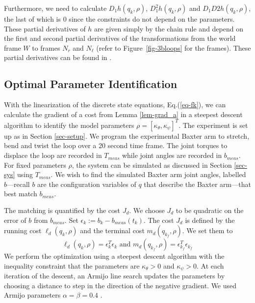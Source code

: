 \documentclass[letterpaper, 10pt, conference]{ieeeconf}
\begin{document}
Furthermore, we need to calculate $D_1h(q_k,\rho)$, $D_1^2h(q_k,\rho)$ and $D_1D2h(q_k,\rho)$, the last of which is $0$ since the constraints do not depend on the parameters.  These partial derivatives of $h$ are given simply by the chain rule and depend on the first and second partial derivatives of the transformations from the world frame $W$ to frames $N_r$ and $N_\ell$ (refer to Figure~\ref{fig-3bloops} for the frames).  These partial derivatives can be found in \cite{johnson_murphey_linearization}.  

\subsection{Optimal Parameter Identification}

With the linearization of the discrete state equations, Eq.(\ref{eq-fk}), we can calculate the gradient of a cost from Lemma \ref{lem-grad_a} in a steepest descent algorithm to identify the model parameters $\rho = [\kappa_\theta,\kappa_\psi]^T$.  The experiment is set up as in Section \ref{sec-setup}.  We program the experimental Baxter arm to stretch, bend and twist the loop over a 20 second time frame. The joint torques to displace the loop are recorded in $T_{meas}$ while joint angles are recorded in $b_{meas}$.    For fixed parameters $\rho$, the system can be simulated as discussed in Section \ref{sec-sys} using $T_{meas}$.  We wish to find the simulated Baxter arm joint angles, labelled $b$---recall $b$ are the configuration variables of $q$ that describe the Baxter arm---that best match $b_{meas}$.

The matching is quantified by the cost $J_d$.  We choose $J_d$ to be quadratic on the error of $b$ from $b_{meas}$.   Set $\epsilon_k := b_k-b_{meas}(t_k)$.  The cost $J_d$ is defined by the running cost $\ell_d(q_k,\rho)$ and the terminal cost $m_d(q_{k_f},\rho)$.  We set them to
\[
\ell_d(q_k,\rho) = \epsilon_k^T\epsilon_k \textrm{ and } m_d(q_{k_f},\rho) = \epsilon_{k_f}^T\epsilon_{k_f}
\]
We perform the optimization using a steepest descent algorithm with the inequality constraint that the parameters are $\kappa_\theta>0$ and $\kappa_\psi>0$.    At each iteration of the descent, an Armijo line search updates the parameters by choosing a distance to step in the direction of the negative gradient.  We used Armijo parameters $\alpha = \beta = 0.4$ \cite{armijo}.
\end{document}
